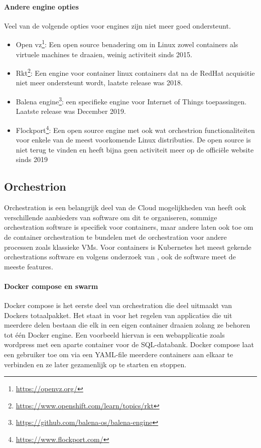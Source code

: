 \paragraph{Andere engine opties}
Veel van de volgende opties voor engines zijn niet meer goed ondersteunt.
\begin{itemize}
    \item Open vz\footnote{\url{https://openvz.org/}}: Een open source benadering om in Linux zowel containers als virtuele machines te draaien, weinig activiteit sinds 2015.
    \item Rkt\footnote{\url{https://www.openshift.com/learn/topics/rkt}}: Een engine voor container linux containers dat na de RedHat acquisitie niet meer ondersteunt wordt, laatste release was 2018.
    \item Balena engine\footnote{\url{https://github.com/balena-os/balena-engine}}: een specifieke engine voor Internet of Things toepassingen.  Laatste release was December 2019.
    \item Flockport\footnote{\url{https://www.flockport.com/}}: Een open source engine met ook wat orchestrion functionaliteiten voor enkele van de meest voorkomende Linux distributies. De open source is niet terug te vinden en heeft bijna geen activiteit meer op de officiële website sinds 2019
\end{itemize}


\subsection{Orchestrion}
Orchestration is een belangrijk deel van de Cloud mogelijkheden van heeft ook verschillende aanbieders van software om dit te organiseren, sommige orchestration software is specifiek voor containers, maar andere laten ook toe om de container orchestration te bundelen met de orchestration voor andere processen zoals klassieke VMs. Voor containers is Kubernetes het meest gekende orchestrations software en volgens onderzoek van \textcite{Truyen2019}, ook de software meet de meeste features.  
\paragraph{Docker compose en swarm}
Docker compose is het eerste deel van orchestration die deel uitmaakt van Dockers totaalpakket. Het staat in voor het regelen van applicaties die uit meerdere delen bestaan die elk in een eigen container draaien zolang ze behoren tot één Docker engine. Een voorbeeld hiervan is een webapplicatie zoals wordpress met een aparte container voor de SQL-databank.  Docker compose laat een gebruiker toe om via een YAML-file meerdere containers aan elkaar te verbinden en ze later gezamenlijk op te starten en stoppen.

